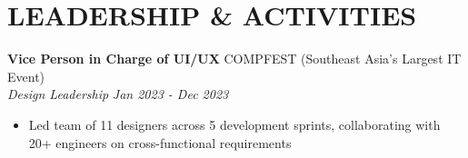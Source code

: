 \documentclass[10pt,a4paper]{article}
\newcommand{\experienceheader}[4]{
    \textbf{#1} \hfill #2 \\
    \textit{#3} \hfill \textit{#4}
}
\begin{document}
\section*{LEADERSHIP \& ACTIVITIES}

\experienceheader{Vice Person in Charge of UI/UX}{COMPFEST (Southeast Asia's Largest IT Event)}{Design Leadership}{Jan 2023 - Dec 2023}
\begin{itemize}[leftmargin=*, itemsep=1pt, topsep=1pt]
    \item Led team of 11 designers across 5 development sprints, collaborating with 20+ engineers on cross-functional requirements
\end{itemize}
\end{document}
